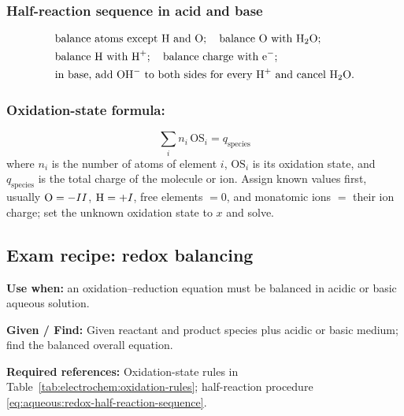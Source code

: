 \subsubsection{Half-reaction sequence in acid and base}
\begin{equation}\label{eq:aqueous:redox-half-reaction-sequence}
\begin{aligned}
&\text{balance atoms except H and O};\quad
\text{balance O with }\ce{H2O};\\
&\text{balance H with }\ce{H+};\quad
\text{balance charge with }\ce{e-};\\
&\text{in base, add }\ce{OH-}\text{ to both sides for every }\ce{H+}\text{ and cancel }\ce{H2O}.
\end{aligned}
\end{equation}

\subsubsection{Oxidation-state formula:}
\begin{equation}\label{eq:aqueous:oxidation-state-sum}
\sum_i n_i\,\mathrm{OS}_i = q_{\text{species}}
\end{equation}
where \(n_i\) is the number of atoms of element \(i\), \(\mathrm{OS}_i\) is its oxidation state, and \(q_{\text{species}}\) is the total charge of the molecule or ion. Assign known values first, usually \(\ce{O}=-II\), \(\ce{H}=+I\), free elements \(=0\), and monatomic ions \(=\) their ion charge; set the unknown oxidation state to \(x\) and solve.

\subsection{Exam recipe: redox balancing}
\textbf{Use when:} an oxidation--reduction equation must be balanced in acidic or basic aqueous solution.

\textbf{Given / Find:} Given reactant and product species plus acidic or basic medium; find the balanced overall equation.

\textbf{Required references:} Oxidation-state rules in Table~\ref{tab:electrochem:oxidation-rules}; half-reaction procedure \eqref{eq:aqueous:redox-half-reaction-sequence}.

